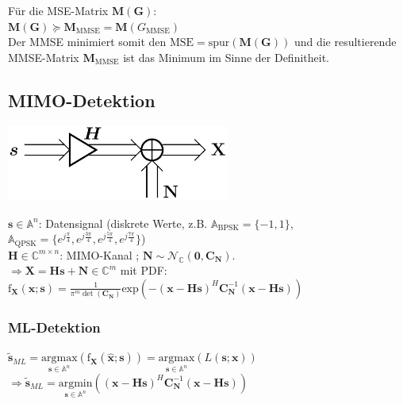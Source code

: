\documentclass[a4paper,landscape,6pt]{article}
\newcommand{\ma}[1]{\ensuremath{\boldsymbol {#1}}}								%
\renewcommand{\vec}[1]{\ensuremath{\boldsymbol {#1}}}							%
\begin{document}
\begin{multicols}{3}
Für die MSE-Matrix $\ma M(\ma G)$:\\
$\ma M(\ma G) \succeq \ma M_{\text{MMSE}} = \ma M(G_\text{MMSE})$ \\

Der MMSE minimiert somit den $\text{MSE} = \text{spur}(\ma M (\ma G))$ und die resultierende MMSE-Matrix $\ma M_{\text{MMSE}}$ ist das Minimum im Sinne der Definitheit.
\subsection*{MIMO-Detektion}
\begin{minipage}[h]{0.35\textwidth}
	\hspace{1.2 cm}
	\includegraphics[width=0.55\textwidth]{images_ssp/Mimo}\\
\end{minipage}
$\vec s \in \mathbb{A}^n$: Datensignal (diskrete Werte, z.B. $\mathbb{A}_{\text{BPSK}}=\{-1,1\}$, $\mathbb{A}_{\text{QPSK}}=\{e^{j\frac{\pi}{4}},e^{j\frac{3\pi}{4}},e^{j\frac{5\pi}{4}},e^{j\frac{7\pi}{4}}\}$)\\
$\ma H \in \mathbb{C}^{m\times n}$: MIMO-Kanal ; $\vec N \sim \mathcal{N}_{\mathbb{C}}(\vec 0, \ma C_{\vec N})$.\\
$\Rightarrow \vec X = \ma H \vec s + \vec N \in \mathbb{C}^m$ mit PDF:\\
$\text{f}_{\vec X}(\vec x; \vec s) = \frac{1}{\pi^m \det(\ma C_{\vec N})} \text{exp}(-(\vec x - \ma H \vec s)^H \ma C_{\vec N}^{-1} (\vec x - \ma H \vec s))$
\subsubsection*{ML-Detektion}
$\tilde{\vec s}_{ML} = \underset{\vec s \in \mathbb{A}^n}{\text{argmax}} \left( \text{f}_{\vec X}(\hat{\vec x}; \vec s) \right) = \underset{\vec s \in \mathbb{A}^n}{\text{argmax}} \left( L(\vec s; \vec x) \right)$\\
$\Rightarrow \boxed{\tilde{\vec s}_{ML} = \underset{\vec s \in \mathbb{A}^n}{\text{argmin}} \left( (\vec x - \ma H \vec s)^H \ma C_{\vec N}^{-1} (\vec x - \ma H \vec s) \right)}$

\end{multicols}
\end{document}
